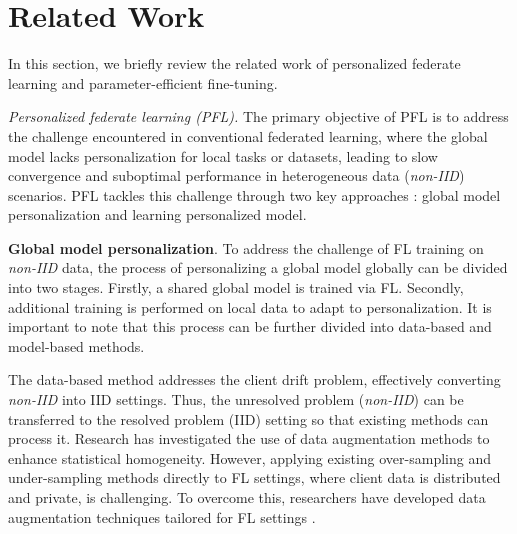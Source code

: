 \documentclass[sigconf]{acmart}
\begin{document}

\section{Related Work} \label{sec:related}
In this section, we briefly review the related work of personalized federate learning and parameter-efficient fine-tuning.
\par
\textit{Personalized federate learning (PFL).} The primary objective of PFL is to address the challenge encountered in conventional federated learning, where the global model lacks personalization for local tasks or datasets, leading to slow convergence and suboptimal performance in heterogeneous data (\textit{non-IID}) scenarios. PFL tackles this challenge through two key approaches \cite{tan2022towards}: global model personalization and learning personalized model.
\par
\textbf{Global model personalization}. To address the challenge of FL training on \textit{non-IID} data, the process of personalizing a global model globally can be divided into two stages. Firstly, a shared global model is trained via FL. Secondly, additional training is performed on local data to adapt to personalization. It is important to note that this process can be further divided into data-based and model-based methods. 
\par
The data-based method addresses the client drift problem, effectively converting \textit{non-IID} into IID settings. Thus, the unresolved problem (\textit{non-IID}) can be transferred to the resolved problem (IID) setting so that existing methods \cite{mcmahan2017communication} can process it. Research has investigated the use of data augmentation methods to enhance statistical homogeneity. However, applying existing over-sampling and under-sampling methods directly to FL settings, where client data is distributed and private, is challenging. To overcome this, researchers have developed data augmentation techniques tailored for FL settings \cite{hao2021towards}.
\par
\end{document}
